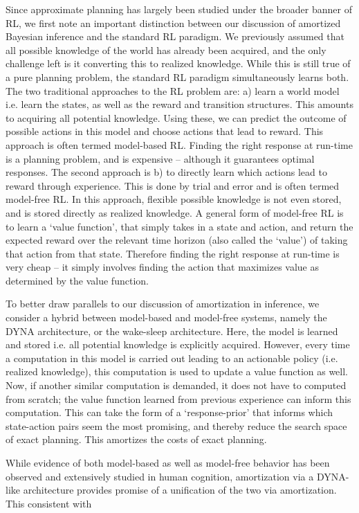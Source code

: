 Since approximate planning has largely been studied under the broader banner of RL, we first note an important distinction between our discussion of amortized Bayesian inference and the standard RL paradigm. We previously assumed that all possible knowledge of the world has already been acquired, and the only challenge left is it converting this to realized knowledge. While this is still true of a pure planning problem, the standard RL paradigm simultaneously learns both. The two traditional approaches to the RL problem are: a) learn a world model i.e. learn the states, as well as the reward and transition structures. This amounts to acquiring all potential knowledge. Using these, we can predict the outcome of possible actions in this model and choose actions that lead to reward. This approach is often termed model-based RL. Finding the right response at run-time is a planning problem, and is expensive -- although it guarantees optimal responses. The second approach is b) to directly learn which actions lead to reward through experience. This is done by trial and error and is often termed model-free RL. In this approach, flexible possible knowledge is not even stored, and is stored directly as realized knowledge. A general form of model-free RL is to learn a `value function', that simply takes in a state and action, and return the expected reward over the relevant time horizon (also called the `value') of taking that action from that state. Therefore finding the right response at run-time is very cheap -- it simply involves finding the action that maximizes value as determined by the value function.

To better draw parallels to our discussion of amortization in inference, we consider a hybrid between model-based and model-free systems, namely the DYNA architecture, or the wake-sleep architecture. Here, the model is learned and stored i.e. all potential knowledge is explicitly acquired. However, every time a computation in this model is carried out leading to an actionable policy (i.e. realized knowledge), this computation is used to update a value function as well. Now, if another similar computation is demanded, it does not have to computed from scratch; the value function learned from previous experience can inform this computation. This can take the form of a `response-prior' that informs which state-action pairs seem the most promising, and thereby reduce the search space of exact planning. This amortizes the costs of exact planning. 

While evidence of both model-based as well as model-free behavior has been observed and extensively studied in human cognition, amortization via a DYNA-like architecture provides promise of a unification of the two via amortization. This consistent with 

